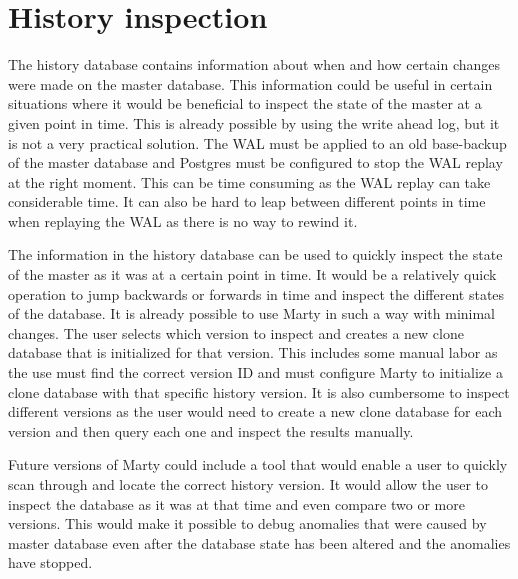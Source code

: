 \section{History inspection}
The history database contains information about when and how certain changes were made on the master database.
This information could be useful in certain situations where it would be beneficial to inspect the state of the master at a given point in time.
This is already possible by using the write ahead log, but it is not a very practical solution.
The WAL must be applied to an old base-backup of the master database and Postgres must be configured to stop the WAL replay at the right moment.
This can be time consuming as the WAL replay can take considerable time.
It can also be hard to leap between different points in time when replaying the WAL as there is no way to rewind it.

The information in the history database can be used to quickly inspect the state of the master as it was at a certain point in time.
It would be a relatively quick operation to jump backwards or forwards in time and inspect the different states of the database.
It is already possible to use Marty in such a way with minimal changes.
The user selects which version to inspect and creates a new clone database that is initialized for that version.
This includes some manual labor as the use must find the correct version ID and must configure Marty to initialize a clone database with that specific history version.
It is also cumbersome to inspect different versions as the user would need to create a new clone database for each version and then query each one and inspect the results manually.

Future versions of Marty could include a tool that would enable a user to quickly scan through and locate the correct history version.
It would allow the user to inspect the database as it was at that time and even compare two or more versions.
This would make it possible to debug anomalies that were caused by master database even after the database state has been altered and the anomalies have stopped.